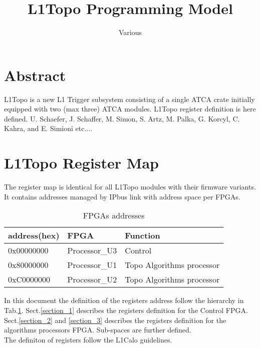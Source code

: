 \documentclass[14pt]{lhcbnote}
\title{L1Topo Programming Model}
\author{Various {\address[BGADD]{J.G.Universiteat Mainz,Germany}}
}
\begin{document}
\section{Abstract}
L1Topo is a new L1 Trigger subsystem consisting of 
a single ATCA crate initially equipped with two (max three) ATCA modules. 
L1Topo register definition is here defined.
U. Schaefer, J. Schaffer, M. Simon, S. Artz, M. Palka, G. Korcyl, C. Kahra,
and E. Simioni etc....

%
\section{L1Topo Register Map}
The register map is identical for all L1Topo modules with their firmware variants. It contains addresses
managed by IPbus link with address space per FPGAs. 

\begin {table}[H]
\begin{center}
\caption {FPGAs addresses}
\label{top_level_addresses}
\begin{tabular}{|l|l|l|}
\hline
address(hex) & FPGA  & Function\\
\hline
0x00000000 & Processor\_U3 & Control \\
0x80000000 & Processor\_U1 & Topo Algorithms processor \\
0xC0000000 & Processor\_U2 & Topo Algorithms processor \\
\hline
\end{tabular}
\end{center}
\end{table}

In this document the definition of the registers address follow the hierarchy in Tab.\ref{top_level_addresses}. 
Sect.\ref{section_1} describes the registers definition for the Control FPGA. Sect.\ref{section_2} 
and \ref{section_3} describes the registers definition for the algorithms processors FPGA.
Sub-spaces are further defined.\\
The definiton of registers follow the L1Calo guidelines.






%
\end{document}
